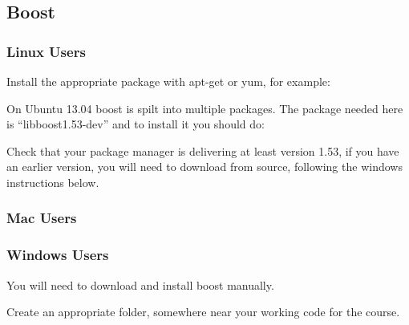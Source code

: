\subsection{Boost}\label{boost}

\subsubsection{Linux Users}\label{linux-users}

Install the appropriate package with apt-get or yum, for example:

\begin{Shaded}
\begin{Highlighting}[]
 
\end{Highlighting}
\end{Shaded}

On Ubuntu 13.04 boost is spilt into multiple packages. The package
needed here is ``libboost1.53-dev'' and to install it you should do:

\begin{Shaded}
\begin{Highlighting}[]
 
\end{Highlighting}
\end{Shaded}

Check that your package manager is delivering at least version 1.53, if
you have an earlier version, you will need to download from source,
following the windows instructions below.

\subsubsection{Mac Users}\label{mac-users}

\begin{Shaded}
\begin{Highlighting}[]
 
\end{Highlighting}
\end{Shaded}

\subsubsection{Windows Users}\label{windows-users}

You will need to download and install boost manually.

Create an appropriate folder, somewhere near your working code for the
course.

